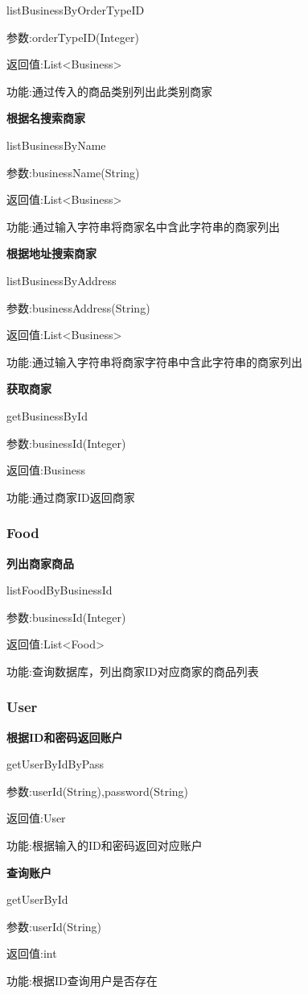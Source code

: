 listBusinessByOrderTypeID

参数:orderTypeID(Integer)

返回值:List<Business>

功能:通过传入的商品类别列出此类别商家

\textbf{根据名搜索商家}

listBusinessByName

参数:businessName(String)

返回值:List<Business>

功能:通过输入字符串将商家名中含此字符串的商家列出

\textbf{根据地址搜索商家}

listBusinessByAddress

参数:businessAddress(String)

返回值:List<Business>

功能:通过输入字符串将商家字符串中含此字符串的商家列出

\textbf{获取商家}

getBusinessById

参数:businessId(Integer)

返回值:Business

功能:通过商家ID返回商家

\subsubsection{Food}
\textbf{列出商家商品}

listFoodByBusinessId

参数:businessId(Integer)

返回值:List<Food>

功能:查询数据库，列出商家ID对应商家的商品列表

\subsubsection{User}
\textbf{根据ID和密码返回账户}

getUserByIdByPass

参数:userId(String),password(String)

返回值:User

功能:根据输入的ID和密码返回对应账户

\textbf{查询账户}

getUserById

参数:userId(String)

返回值:int

功能:根据ID查询用户是否存在

